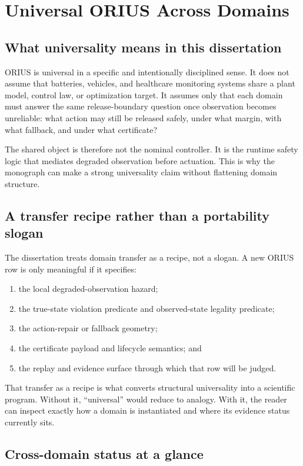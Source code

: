 \chapter{Universal ORIUS Across Domains}
\label{ch:universal-orius-across-domains}

\section{What universality means in this dissertation}
ORIUS is universal in a specific and intentionally disciplined sense. It does not assume
that batteries, vehicles, and healthcare monitoring systems share a plant model, control
law, or optimization target. It assumes only that each domain must answer the same
release-boundary question once observation becomes unreliable: what action may still be
released safely, under what margin, with what fallback, and under what certificate?

The shared object is therefore not the nominal controller. It is the runtime safety logic
that mediates degraded observation before actuation. This is why the monograph can make a
strong universality claim without flattening domain structure.

\section{A transfer recipe rather than a portability slogan}
The dissertation treats domain transfer as a recipe, not a slogan. A new ORIUS row is only
meaningful if it specifies:
\begin{enumerate}
  \item the local degraded-observation hazard;
  \item the true-state violation predicate and observed-state legality predicate;
  \item the action-repair or fallback geometry;
  \item the certificate payload and lifecycle semantics; and
  \item the replay and evidence surface through which that row will be judged.
\end{enumerate}

That transfer as a recipe is what converts structural universality into a scientific
program. Without it, ``universal'' would reduce to analogy. With it, the reader can inspect
exactly how a domain is instantiated and where its evidence status currently sits.

\section{Cross-domain status at a glance}

